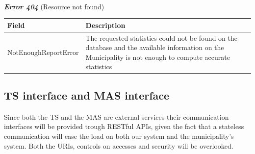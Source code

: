 						\paragraph{}
							\textcolor{myRed}{\textit{\textbf{Error 404}}} (Resource not found)
							\vspace{-2mm}
							\begin{table}[!h]
								\begin{tabular}{L{0.35\textwidth}L{0.57\textwidth}}
									\toprule
									\textbf{Field} & \textbf{Description} \\
									\midrule
								  	NotEnoughReportError & The requested statistics could not be found on the database and the available information on the Municipality is not enough to compute accurate statistics \\
								 	\bottomrule
								\end{tabular}
							\end{table}
			\clearpage
			\subsection{TS interface and MAS interface}
				\paragraph{}
					Since both the TS and the MAS are external services their communication interfaces will be provided trough RESTful APIs, given the fact that a stateless communication will ease the load on both our system and the municipality's system. Both the URIs, controls on accesses and security will be overlooked.
